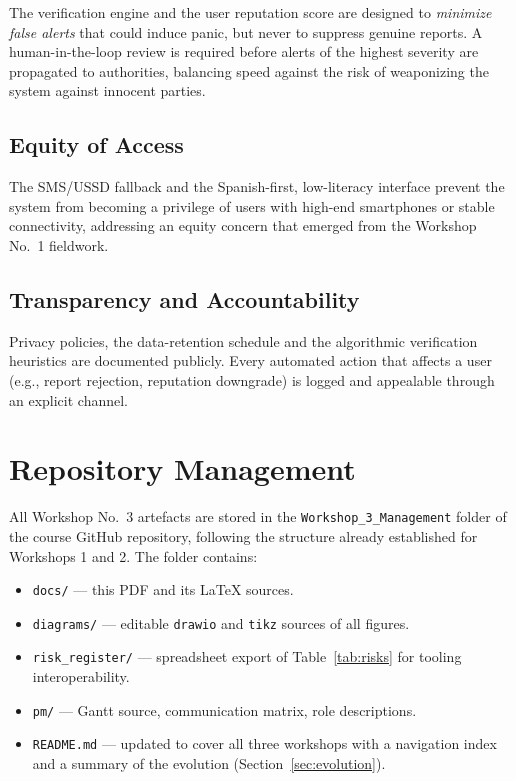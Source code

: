 \documentclass[conference,a4paper,10pt]{IEEEtran}
\begin{document}
The verification engine and the user reputation score are designed to
\emph{minimize false alerts} that could induce panic, but never to
suppress genuine reports. A human-in-the-loop review is required before
alerts of the highest severity are propagated to authorities, balancing
speed against the risk of weaponizing the system against innocent
parties.

\subsection{Equity of Access}

The SMS/USSD fallback and the Spanish-first, low-literacy interface
prevent the system from becoming a privilege of users with high-end
smartphones or stable connectivity, addressing an equity concern that
emerged from the Workshop No.\ 1 fieldwork.

\subsection{Transparency and Accountability}

Privacy policies, the data-retention schedule and the algorithmic
verification heuristics are documented publicly. Every automated action
that affects a user (e.g., report rejection, reputation downgrade) is
logged and appealable through an explicit channel.

\section{Repository Management}
\label{sec:repo}

All Workshop No.\ 3 artefacts are stored in the
\texttt{Workshop\_3\_Management} folder of the course GitHub repository,
following the structure already established for Workshops 1 and 2. The
folder contains:

\begin{itemize}[leftmargin=*]
  \item \texttt{docs/} --- this PDF and its \LaTeX{} sources.
  \item \texttt{diagrams/} --- editable \texttt{drawio} and
  \texttt{tikz} sources of all figures.
  \item \texttt{risk\_register/} --- spreadsheet export of
  Table~\ref{tab:risks} for tooling interoperability.
  \item \texttt{pm/} --- Gantt source, communication matrix, role
  descriptions.
  \item \texttt{README.md} --- updated to cover all three workshops with
  a navigation index and a summary of the evolution
  (Section~\ref{sec:evolution}).
\end{itemize}
\end{document}
